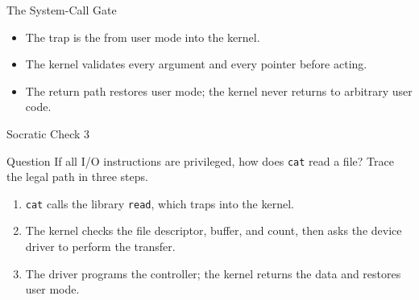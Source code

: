 \documentclass[aspectratio=169]{beamer}
\begin{document}
\begin{frame}{The System-Call Gate}
  \centering
  \vspace{0.25cm}
  \begin{itemize}
    \item The trap is the  from user mode into the kernel.
    \item The kernel validates every argument and every pointer before acting.
    \item The return path restores user mode; the kernel never returns to
      arbitrary user code.
  \end{itemize}
\end{frame}

\begin{frame}{Socratic Check 3}
  \begin{block}{Question}
    If all I/O instructions are privileged, how does \texttt{cat} read a file?
    Trace the legal path in three steps.
  \end{block}
  \vspace{0.25cm}
  \begin{enumerate}
    \item \texttt{cat} calls the library \texttt{read}, which traps into the
      kernel.
    \item The kernel checks the file descriptor, buffer, and count, then asks
      the device driver to perform the transfer.
    \item The driver programs the controller; the kernel returns the data and
      restores user mode.
  \end{enumerate}
\end{frame}

\end{document}
